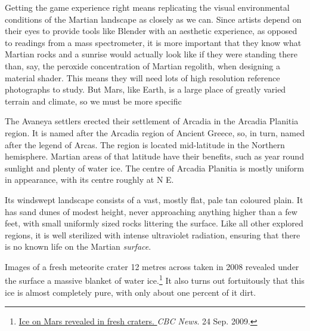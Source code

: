 


Getting the game experience right means replicating the visual environmental conditions of the Martian landscape as closely as we can. Since artists depend on their eyes to provide tools like Blender with an aesthetic experience, as opposed to readings from a mass spectrometer, it is more important that they know what Martian rocks and a sunrise would actually look like if they were standing there than, say, the peroxide concentration of Martian regolith, when designing a material shader. This means they will need lots of high resolution reference photographs to study. But Mars, like Earth, is a large place of greatly varied terrain and climate, so we must be more specific

    {}

The Avaneya settlers erected their settlement of Arcadia in the Arcadia Planitia region. It is named after the Arcadia region of Ancient Greece, so, in turn, named after the legend of Arcas. The region is located mid-latitude in the Northern hemisphere. Martian areas of that latitude have their benefits, such as year round sunlight and plenty of water ice. The centre of Arcadia Planitia is mostly uniform in appearance, with its centre roughly at N E.

Its windswept landscape consists of a vast, mostly flat, pale tan coloured plain. It has sand dunes of modest height, never approaching anything higher than a few feet, with small uniformly sized rocks littering the surface. Like all other explored regions, it is well sterilized with intense ultraviolet radiation, ensuring that there is no known life on the Martian {\it surface}.

Images of a fresh meteorite crater 12 metres across taken in 2008 revealed under the surface a massive blanket of water ice.\footnote{\href{http://www.cbc.ca/news/technology/story/2009/09/24/tech-space-water-mars-crater.html}{Ice on Mars revealed in fresh craters. }{\it CBC News}. 24 Sep. 2009.} It also turns out fortuitously that this ice is almost completely pure, with only about one percent of it dirt.

